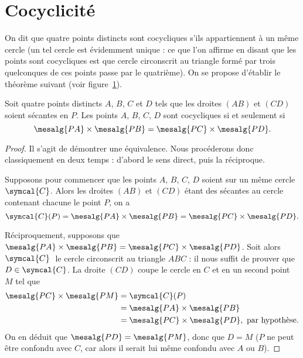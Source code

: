 \section{Cocyclicité}
On dit que quatre points distincts sont cocycliques s'ils appartiennent à un même cercle (un tel cercle est évidemment unique : ce que l'on affirme en disant que les points sont cocycliques est que cercle circonscrit au triangle formé par trois quelconques de ces points passe par le quatrième). On se propose d'établir le théorème suivant (voir figure~\ref{figcocy}).

\begin{thm} Soit quatre points distincts $A$, $B$, $C$ et $D$ tels que les droites $(AB)$ et $(CD)$ soient sécantes en $P$. Les points $A$, $B$, $C$, $D$ sont cocycliques si et seulement si 
\[\mesalg{PA}\times\mesalg{PB}=\mesalg{PC}\times\mesalg{PD}.\]
\end{thm}

\begin{figure}[ht]
\centering
{}
\figcaption{}\label{figcocy}
\end{figure}

\begin{proof}
Il s'agit de démontrer une équivalence. Nous procéderons donc classiquement en deux temps : d'abord le sens direct, puis la réciproque.

Supposons pour commencer que les points $A$, $B$, $C$, $D$ soient sur un même cercle $\symcal{C}$. Alors les droites $(AB)$ et $(CD)$ étant des sécantes au cercle contenant chacune le point $P$, on a
\[\symcal{C}(P)=\mesalg{PA}\times\mesalg{PB}=\mesalg{PC}\times\mesalg{PD}.\]

Réciproquement, supposons que $\mesalg{PA}\times\mesalg{PB}=\mesalg{PC}\times\mesalg{PD}$. Soit alors $\symcal{C}\;$ le cercle circonscrit au triangle $ABC$ : il nous suffit de prouver que $D\in\symcal{C}$. La droite $(CD)$ coupe le cercle en $C$ et en un second point $M$ tel que
\begin{align*}\mesalg{PC}\times\mesalg{PM}&=\symcal{C}(P)\\
&=\mesalg{PA}\times\mesalg{PB}\\
&=\mesalg{PC}\times\mesalg{PD}, \text{ par hypothèse.}
\end{align*}
On en déduit que $\mesalg{PD}=\mesalg{PM}$, donc que $D=M$ ($P$ ne peut être confondu avec $C$, car alors il serait lui même confondu avec $A$ ou $B$).
\end{proof}


